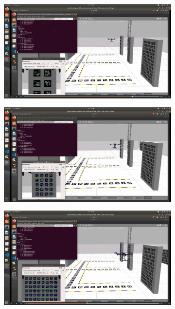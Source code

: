 \documentclass[../Head/report.tex]{subfiles}
\begin{document}
\begin{figure}[H]
    \centering
    \begin{subfigure}[t]{.30\textwidth}
        \centering
        \includegraphics[width=\textwidth]{../Figures/landing_test/landing_station_one.png}
        \caption{}
        \label{fig:vision_based_landing_landing_station_one}
    \end{subfigure}
     \hspace{0.2em}
    \begin{subfigure}[t]{.30\textwidth}
        \centering
        \includegraphics[width=\textwidth]{../Figures/landing_test/landing_station_two.png}
        \caption{}
        \label{fig:vision_based_landing_landing_station_two}
    \end{subfigure}
     \hspace{0.2em}
    \begin{subfigure}[t]{.30\textwidth}
        \centering
        \includegraphics[width=\textwidth]{../Figures/landing_test/landing_station_three.png}

\end{subfigure}
\end{figure}
\end{document}
